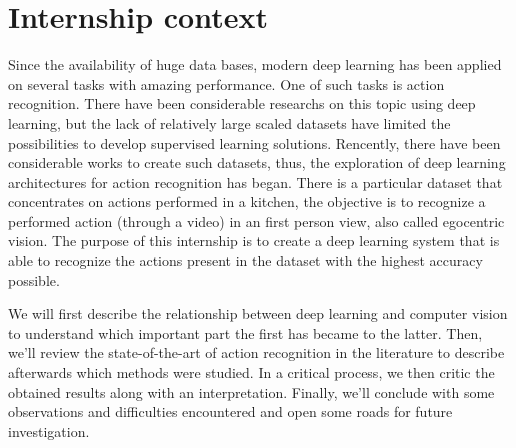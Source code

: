 \documentclass[12pt, a4paper]{report}
\begin{document}
		\section{Internship context}
			Since the availability of huge data bases, modern deep learning has been applied on several tasks with amazing performance.
			One of such tasks is action recognition.
			There have been considerable researchs on this topic using deep learning, but the lack of relatively large scaled datasets have limited the possibilities to develop supervised learning solutions.
			Rencently, there have been considerable works to create such datasets, thus, the exploration of deep learning architectures for action recognition has began.
			There is a particular dataset that concentrates on actions performed in a kitchen, the objective is to recognize a performed action (through a video) in an first person view, also called egocentric vision.
			The purpose of this internship is to create a deep learning system that is able to recognize the actions present in the dataset with the highest accuracy possible.\par
			\bigbreak
			We will first describe the relationship between deep learning and computer vision to understand which important part the first has became to the latter.
			Then, we'll review the state-of-the-art of action recognition in the literature to describe afterwards which methods were studied.
			In a critical process, we then critic the obtained results along with an interpretation.
			Finally, we'll conclude with some observations and difficulties encountered and open some roads for future investigation.
\end{document}
